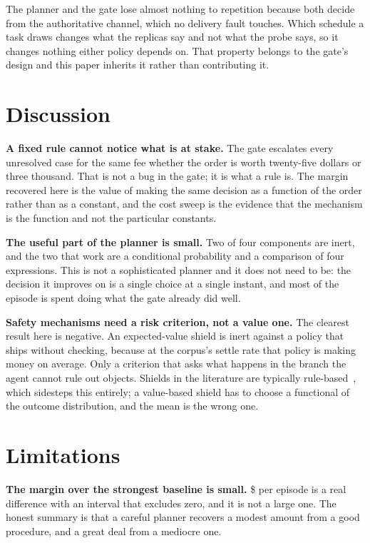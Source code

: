 \documentclass[conference]{IEEEtran}
\begin{document}
The planner and the gate lose almost nothing to repetition because both decide
from the authoritative channel, which no delivery fault touches. Which schedule
a task draws changes what the replicas say and not what the probe says, so it
changes nothing either policy depends on. That property belongs to the gate's
design and this paper inherits it rather than contributing it.

\section{Discussion}

\textbf{A fixed rule cannot notice what is at stake.} The gate escalates every
unresolved case for the same fee whether the order is worth twenty-five dollars
or three thousand. That is not a bug in the gate; it is what a rule is. The
margin recovered here is the value of making the same decision as a function of
the order rather than as a constant, and the cost sweep is the evidence that the
mechanism is the function and not the particular constants.

\textbf{The useful part of the planner is small.} Two of four components are
inert, and the two that work are a conditional probability and a comparison of
four expressions. This is not a sophisticated planner and it does not need to
be: the decision it improves on is a single choice at a single instant, and most
of the episode is spent doing what the gate already did well.

\textbf{Safety mechanisms need a risk criterion, not a value one.} The clearest
result here is negative. An expected-value shield is inert against a policy that
ships without checking, because at the corpus's settle rate that policy is
making money on average. Only a criterion that asks what happens in the branch
the agent cannot rule out objects. Shields in the literature are typically
rule-based~\cite{shieldagent}, which sidesteps this entirely; a value-based
shield has to choose a functional of the outcome distribution, and the mean is
the wrong one.

\section{Limitations}

\textbf{The margin over the strongest baseline is small.} \$\vsGateReduction{}
per episode is a real difference with an interval that excludes zero, and it is
not
a large one. The honest summary is that a careful planner recovers a modest
amount from a good procedure, and a great deal from a mediocre one.
\end{document}
